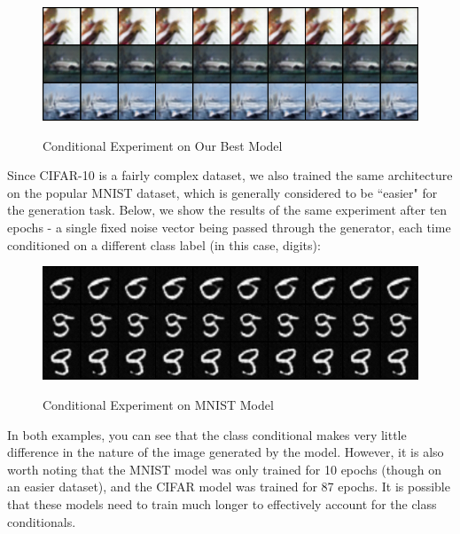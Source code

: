 \documentclass[a4paper]{article}
\begin{document}
\begin{figure}[H]
  \includegraphics[scale=0.5]{images/conditional_400_fixed_noise_conditional_fake.png}
  \label{fig:boat1}
  \caption{Conditional Experiment on Our Best Model}
\end{figure}
Since CIFAR-10 is a fairly complex dataset, we also trained the same architecture on the popular MNIST dataset, which is generally considered to be ``easier" for the generation task. Below, we show the results of the same experiment after ten epochs - a single fixed noise vector being passed through the generator, each time conditioned on a different class label (in this case, digits):
\begin{figure}[H]
  \includegraphics[scale=0.5]{images/MNIST_fixed_noise_conditional_fake.png}
  \label{fig:boat1}
  \caption{Conditional Experiment on MNIST Model}
\end{figure}
In both examples, you can see that the class conditional makes very little difference in the nature of the image generated by the model. However, it is also worth noting that the MNIST model was only trained for 10 epochs (though on an easier dataset), and the CIFAR model was trained for 87 epochs. It is possible that these models need to train much longer to effectively account for the class conditionals.
\end{document}
